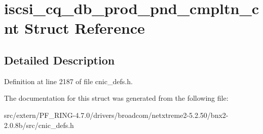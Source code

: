 \hypertarget{structiscsi__cq__db__prod__pnd__cmpltn__cnt}{
\section{iscsi\_\-cq\_\-db\_\-prod\_\-pnd\_\-cmpltn\_\-cnt Struct Reference}
\label{structiscsi__cq__db__prod__pnd__cmpltn__cnt}
}


\subsection{Detailed Description}


Definition at line 2187 of file cnic\_\-defs.h.



The documentation for this struct was generated from the following file:\begin{DoxyCompactItemize}
\item 
src/extern/PF\_\-RING-\/4.7.0/drivers/broadcom/netxtreme2-\/5.2.50/bnx2-\/2.0.8b/src/cnic\_\-defs.h\end{DoxyCompactItemize}

